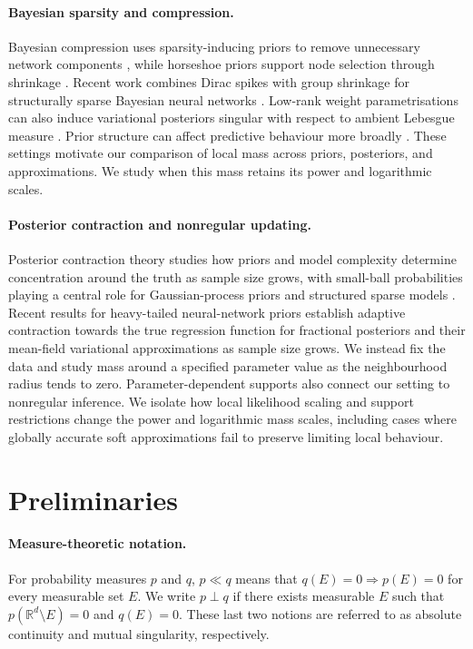 \documentclass[11pt,a4paper]{article}
\theoremstyle{compactplain}
\theoremstyle{compactdefinition}
\numberwithin{equation}{section}
\begin{document}
\paragraph{Bayesian sparsity and compression.}
Bayesian compression uses sparsity-inducing priors to remove unnecessary network components \cite{louizos2017bayes}, while horseshoe priors support node selection through shrinkage \cite{ghosh_model_nodate}. Recent work combines Dirac spikes with group shrinkage for structurally sparse Bayesian neural networks \cite{jantre2025spike}. Low-rank weight parametrisations can also induce variational posteriors singular with respect to ambient Lebesgue measure \cite{toure2026singular}. Prior structure can affect predictive behaviour more broadly \cite{fortuin_bayesian_2022}. These settings motivate our comparison of local mass across priors, posteriors, and approximations. We study when this mass retains its power and logarithmic scales.

\paragraph{Posterior contraction and nonregular updating.}
Posterior contraction theory \cite{ghosal2000convergence} studies how priors and model complexity determine concentration around the truth as sample size grows, with small-ball probabilities playing a central role for Gaussian-process priors \cite{van2008rates} and structured sparse models \cite{castillo2015bayesian,polson_posterior_2018}. Recent results for heavy-tailed neural-network priors \cite{castillo2025posterior} establish adaptive contraction towards the true regression function for fractional posteriors and their mean-field variational approximations as sample size grows. We instead fix the data and study mass around a specified parameter value as the neighbourhood radius tends to zero. Parameter-dependent supports \cite{hirano2003asymptotic} also connect our setting to nonregular inference. We isolate how local likelihood scaling and support restrictions change the power and logarithmic mass scales, including cases where globally accurate soft approximations fail to preserve limiting local behaviour. 

\section{Preliminaries}

\paragraph{Measure-theoretic notation.}
For probability measures \(p\) and \(q\), \(p\ll q\) means that
\(q(E)=0\Rightarrow p(E)=0\) for every measurable set \(E\). We write
\(p\perp q\) if there exists measurable \(E\) such that
\(p(\mathbb R^d\setminus E)=0\) and \(q(E)=0\). These last two notions are referred
to as absolute continuity and mutual singularity, respectively.
\end{document}
